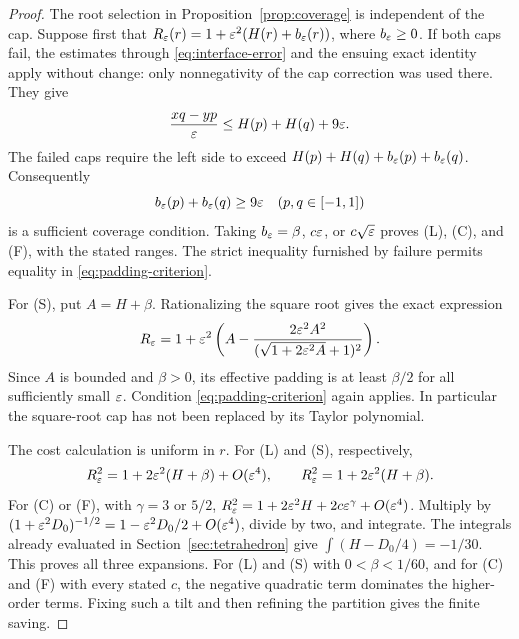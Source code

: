 \begin{proof}
The root selection in Proposition~\ref{prop:coverage} is independent
of the cap. Suppose first that
$R_\varepsilon(r)=1+\varepsilon^2(H(r)+b_\varepsilon(r))$, where $b_\varepsilon\ge0$.
If both caps fail, the estimates through \eqref{eq:interface-error}
and the ensuing exact identity apply without change: only nonnegativity
of the cap correction was used there. They give
\begin{equation}\label{eq:cap-failure-bound}
 \frac{xq-yp}{\varepsilon}\le H(p)+H(q)+9\varepsilon.
\end{equation}
The failed caps require the left side to exceed
$H(p)+H(q)+b_\varepsilon(p)+b_\varepsilon(q)$. Consequently
\begin{equation}\label{eq:padding-criterion}
 b_\varepsilon(p)+b_\varepsilon(q)\ge9\varepsilon\quad(p,q\in[-1,1])
\end{equation}
is a sufficient coverage condition. Taking $b_\varepsilon=\beta$, $c\varepsilon$,
or $c\sqrt{\varepsilon}$ proves (L), (C), and (F), with the stated ranges.
The strict inequality furnished by failure permits equality in
\eqref{eq:padding-criterion}.

For (S), put $A=H+\beta$. Rationalizing the square root gives the
exact expression
\[
 R_\varepsilon=1+\varepsilon^2\left(A-
 \frac{2\varepsilon^2A^2}{(\sqrt{1+2\varepsilon^2A}+1)^2}\right).
\]
Since $A$ is bounded and $\beta>0$, its effective padding is at least
$\beta/2$ for all sufficiently small $\varepsilon$. Condition
\eqref{eq:padding-criterion} again applies. In particular the square-root
cap has not been replaced by its Taylor polynomial.

The cost calculation is uniform in $r$. For (L) and (S), respectively,
\[
 R_\varepsilon^2=1+2\varepsilon^2(H+\beta)+O(\varepsilon^4),
 \qquad R_\varepsilon^2=1+2\varepsilon^2(H+\beta).
\]
For (C) or (F), with $\gamma=3$ or $5/2$,
$R_\varepsilon^2=1+2\varepsilon^2H+2c\varepsilon^\gamma+O(\varepsilon^4)$.
Multiply by
$(1+\varepsilon^2D_0)^{-1/2}=1-\varepsilon^2D_0/2+O(\varepsilon^4)$,
divide by two, and integrate. The integrals already evaluated in
Section~\ref{sec:tetrahedron} give
$\int(H-D_0/4)=-1/30$. This proves all three expansions.
For (L) and (S) with $0<\beta<1/60$, and for (C) and (F) with every
stated $c$, the negative quadratic term dominates the higher-order terms.
Fixing such a tilt and then refining the partition gives the finite saving.
\end{proof}


